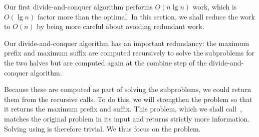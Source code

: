\begin{gram}
Our first divide-and-conquer algorithm performs $O(n \lg n)$ work,
which is $O(\lg{n})$ factor more than the optimal.
%
In this section, we shall reduce the work to $O(n)$ by being more
careful about avoiding redundant work.
%
%
\end{gram}





\begin{gram}[Intuition]
Our divide-and-conquer algorithm has an important redundancy: the
maximum prefix and maximum suffix are computed recursively to solve
the subproblems for the two halves but are computed again at the
combine step of the divide-and-conquer algorithm.
%

Because these are computed as part of solving the subproblems, we
could return them from the recursive calls.  
%
To do this, we will strengthen the problem so that it returns the
maximum prefix and suffix.  
%
This problem, which we shall call~, matches the
original \MCSS{} problem in its input and returns strictly more
information.
% 
Solving \MCSS{} using \MCSSPS{} is therefore trivial.  
%
We thus focus on the \MCSSPS{} problem.
\end{gram}

%

